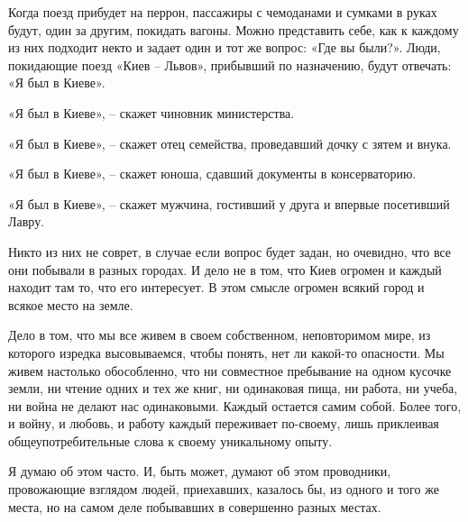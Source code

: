 Когда поезд прибудет на перрон, пассажиры с чемоданами и сумками в руках будут, один за другим, покидать вагоны. Можно представить себе, как к каждому из них подходит некто и задает один и тот же вопрос: «Где вы были?». Люди, покидающие поезд «Киев – Львов», прибывший по назначению, будут отвечать: «Я был в Киеве».

«Я был в Киеве», – скажет чиновник министерства.

«Я был в Киеве», – скажет отец семейства, проведавший дочку с зятем и внука.

«Я был в Киеве», – скажет юноша, сдавший документы в консерваторию.

«Я был в Киеве», – скажет мужчина, гостивший у друга и впервые посетивший Лавру.

Никто из них не соврет, в случае если вопрос будет задан, но очевидно, что все они побывали в разных городах. И дело не в том, что Киев огромен и каждый находит там то, что его интересует. В этом смысле огромен всякий город и всякое место на земле.

Дело в том, что мы все живем в своем собственном, неповторимом мире, из которого изредка высовываемся, чтобы понять, нет ли какой-то опасности. Мы живем настолько обособленно, что ни совместное пребывание на одном кусочке земли, ни чтение одних и тех же книг, ни одинаковая пища, ни работа, ни учеба, ни война не делают нас одинаковыми. Каждый остается самим собой. Более того, и войну, и любовь, и работу каждый переживает по-своему, лишь приклеивая общеупотребительные слова к своему уникальному опыту.

Я думаю об этом часто. И, быть может, думают об этом проводники, провожающие взглядом людей, приехавших, казалось бы, из одного и того же места, но на самом деле побывавших в совершенно разных местах.
